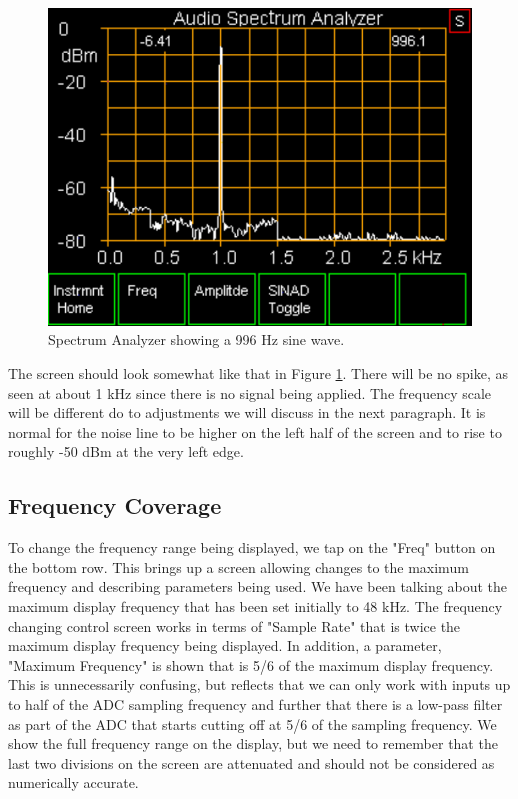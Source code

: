 \begin{figure}[H]
\begin{center}
\includegraphics[scale=0.75]{./images/AVNA_019.pdf}
\caption{Spectrum Analyzer  showing a 996 Hz sine wave.  }
\label{AVNA_019-label}
\end{center}
\end{figure}
%
The screen should look somewhat like that in Figure \ref{AVNA_019-label}.  There will be no spike, as seen at about 1 kHz since there is no signal being applied.  The frequency scale will be different do to adjustments we will discuss in the next paragraph.  It is normal for the noise line to be higher on the left half of the screen and to rise to roughly -50 dBm at the very left edge.

\subsection{Frequency Coverage} To change the frequency range being displayed, we tap on the "\textsf{Freq}" button on the bottom row.  This brings up a screen allowing changes to the maximum frequency and describing parameters  being used.  We have been talking about the maximum display frequency that has been set initially to 48 kHz.  The frequency changing control screen works in terms of "Sample Rate" that is twice the maximum display frequency being displayed.  In addition, a parameter, "Maximum Frequency" is shown that is 5/6 of the maximum display frequency.  This is unnecessarily confusing, but reflects that we can only work with inputs up to half of the ADC sampling frequency and further that there is a low-pass filter as part of the ADC that starts cutting off at 5/6 of the sampling frequency.  We show the full frequency range on the display, but we need to remember that the last two divisions on the screen are attenuated and should not be considered as numerically accurate.

